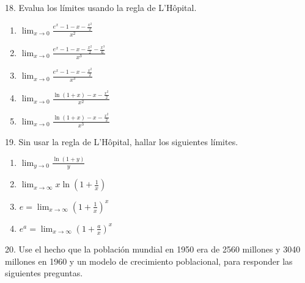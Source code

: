 \documentclass[12pt]{article}
\begin{document}
18. Evalua los l\'imites usando la regla de L'H\^opital.

\begin{enumerate}[\hspace{9px} a)]
    \item \(\displaystyle\lim_{x \to 0}\frac{e^x-1-x-\frac{x^2}{2}}{x^2}\)
    
    \item \(\displaystyle\lim_{x \to 0}\frac{e^x-1-x-\frac{x^2}{2}-\frac{x^3}{6}}{x^3}\)
    
    \item \(\displaystyle\lim_{x \to 0}\frac{e^x-1-x-\frac{x^2}{2}}{x^3}\)
    
    \item \(\displaystyle\lim_{x \to 0}\frac{\ln(1+x)-x-\frac{x^2}{2}}{x^2}\)
    
    \item \(\displaystyle\lim_{x \to 0}\frac{\ln(1+x)-x-\frac{x^2}{2}}{x^3}\)

\end{enumerate}

19. Sin usar la regla de L'H\^opital, hallar los siguientes l\'imites.

\begin{enumerate}[\hspace{9px} a)]
    \item \(\displaystyle\lim_{y \to 0}\frac{\ln(1+y)}{y}\)
    
    \item \(\displaystyle\lim_{x \to \infty}x\ln\left(1+\frac{1}{x}\right)\)
    
    \item \(e=\displaystyle\lim_{x \to \infty}\left(1+\frac{1}{x}\right)^x\)
    
    \item \(e^a=\displaystyle\lim_{x \to \infty}\left(1+\frac{a}{x}\right)^x\)
    
\end{enumerate}

20. Use el hecho que la poblaci\'on mundial en 1950 era de 2560 millones y 3040 millones en 1960 y un modelo de crecimiento poblacional, para responder las siguientes preguntas.
\end{document}
